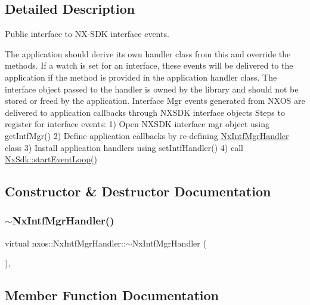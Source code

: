 \subsection{Detailed Description}
Public interface to N\+X-\/\+S\+DK interface events. 

The application should derive its own handler class from this and override the methods. If a watch is set for an interface, these events will be delivered to the application if the method is provided in the application handler class. The interface object passed to the handler is owned by the library and should not be stored or freed by the application. Interface Mgr events generated from N\+X\+OS are delivered to application callbacks through N\+X\+S\+DK interface objects Steps to register for interface events\+: 1) Open N\+X\+S\+DK interface mgr object using get\+Intf\+Mgr() 2) Define application callbacks by re-\/defining \mbox{\hyperlink{classnxos_1_1_nx_intf_mgr_handler}{Nx\+Intf\+Mgr\+Handler}} class 3) Install application handlers using set\+Intf\+Handler() 4) call \mbox{\hyperlink{classnxos_1_1_nx_sdk_a75ca70643fe325ddf0eea62c1f8c4cc8}{Nx\+Sdk\+::start\+Event\+Loop()}} 

\subsection{Constructor \& Destructor Documentation}
\mbox{\label{classnxos_1_1_nx_intf_mgr_handler_a565ee1dba09df646d82cccad25d914c4}} 
\subsubsection{\texorpdfstring{$\sim$\+Nx\+Intf\+Mgr\+Handler()}{~NxIntfMgrHandler()}}
{\footnotesize\ttfamily virtual nxos\+::\+Nx\+Intf\+Mgr\+Handler\+::$\sim$\+Nx\+Intf\+Mgr\+Handler (\begin{DoxyParamCaption}{ }\end{DoxyParamCaption})\hspace{0.3cm}{\ttfamily [inline]}, {\ttfamily [virtual]}}



\subsection{Member Function Documentation}
\mbox{\label{classnxos_1_1_nx_intf_mgr_handler_afe79bff5ee5b314111e2ce7c7226e73f}} 
